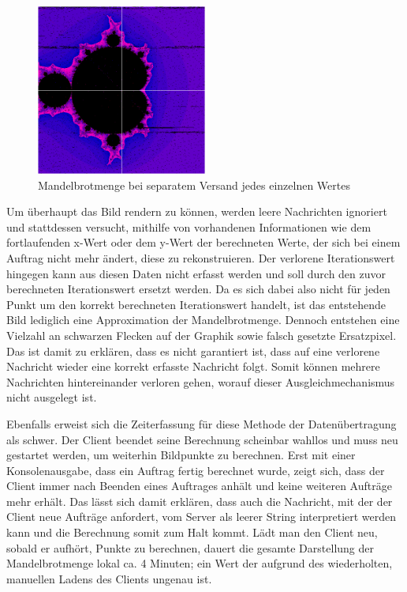 \documentclass[12pt, onecolumn, notitlepage]{scrartcl}
\begin{document}
\begin{figure}[htbp] 
	\centering
	\includegraphics[width=0.5\textwidth]{einzelnVersandt.PNG}
	\caption{Mandelbrotmenge bei separatem Versand jedes einzelnen Wertes}
	\label{fig:Bild1}
\end{figure}

Um überhaupt das Bild rendern zu können, werden leere Nachrichten ignoriert und stattdessen versucht, mithilfe von vorhandenen Informationen wie dem fortlaufenden x-Wert oder dem y-Wert der berechneten Werte, der sich bei einem Auftrag nicht mehr ändert, diese zu rekonstruieren. Der verlorene Iterationswert hingegen kann aus diesen Daten nicht erfasst werden und soll durch den zuvor berechneten Iterationswert ersetzt werden. Da es sich dabei also nicht für jeden Punkt um den korrekt berechneten Iterationswert handelt, ist das entstehende Bild lediglich eine Approximation der Mandelbrotmenge. Dennoch entstehen eine Vielzahl an schwarzen Flecken auf der Graphik sowie falsch gesetzte Ersatzpixel. Das ist damit zu erklären, dass es nicht garantiert ist, dass auf eine verlorene Nachricht wieder eine korrekt erfasste Nachricht folgt. Somit können mehrere Nachrichten hintereinander verloren gehen, worauf dieser Ausgleichmechanismus nicht ausgelegt ist. \par

Ebenfalls erweist sich die Zeiterfassung für diese Methode der Datenübertragung als schwer. Der Client beendet seine Berechnung scheinbar wahllos und muss neu gestartet werden, um weiterhin Bildpunkte zu berechnen. Erst mit einer Konsolenausgabe, dass ein Auftrag fertig berechnet wurde, zeigt sich, dass der Client immer nach Beenden eines Auftrages anhält und keine weiteren Aufträge mehr erhält. Das lässt sich damit erklären, dass auch die Nachricht, mit der der Client neue Aufträge anfordert, vom Server als leerer String interpretiert werden kann und die Berechnung somit zum Halt kommt. Lädt man den Client neu, sobald er aufhört, Punkte zu berechnen, dauert die gesamte Darstellung der Mandelbrotmenge lokal ca. 4 Minuten; ein Wert der aufgrund des wiederholten, manuellen Ladens des Clients ungenau ist.\par
\end{document}
